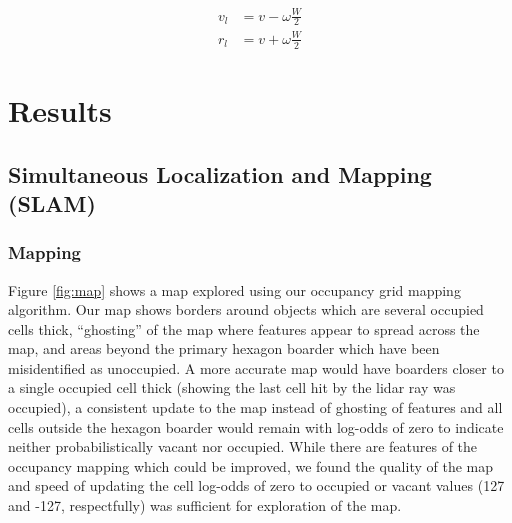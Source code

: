 \documentclass[journal]{IEEEtran}
\begin{document}
            \begin{equation} \label{eq:wheel_speeds}
                \begin{split}
                    v_l &= v - \omega\frac{W}{2} \\
                    r_l &= v + \omega\frac{W}{2}
                \end{split}
            \end{equation}
    
\section{Results}

    \subsection{Simultaneous Localization and Mapping (SLAM)}
    
        \subsubsection{Mapping}
        
            Figure \ref{fig:map} shows a map explored using our occupancy grid mapping algorithm. Our map shows borders around objects which are several occupied cells thick, “ghosting” of the map where features appear to spread across the map, and areas beyond the primary hexagon boarder which have been misidentified as unoccupied. A more accurate map would have boarders closer to a single occupied cell thick (showing the last cell hit by the lidar ray was occupied), a consistent update to the map instead of ghosting of features and all cells outside the hexagon boarder would remain with log-odds of zero to indicate neither probabilistically vacant nor occupied. While there are features of the occupancy mapping which could be improved, we found the quality of the map and speed of updating the cell log-odds of zero to occupied or vacant values (127 and -127, respectfully) was sufficient for exploration of the map.
            
\end{document}
